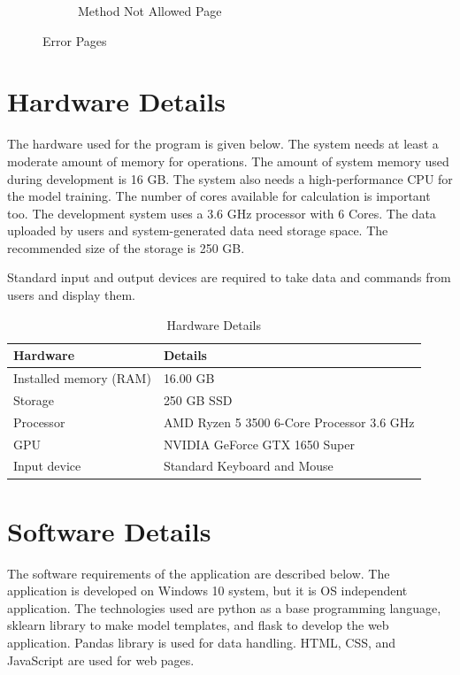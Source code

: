 \begin{figure}[H]
\begin{subfigure}{.7\columnwidth}
    \caption{Method Not Allowed Page}
    \label{fig:405_page}
  \end{subfigure}%
  \caption{Error Pages}\label{fig:error_pages}
\end{figure}

\FloatBarrier
\section{Hardware Details} \label{sec:hardware_details}
The hardware used for the program is given below. The system needs at least a moderate amount of memory for operations. The amount of system memory used during development is 16 GB. The system also needs a high-performance CPU for the model training. The number of cores available for calculation is important too. The development system uses a 3.6 GHz processor with 6 Cores. The data uploaded by users and system-generated data need storage space. The recommended size of the storage is 250 GB.

Standard input and output devices are required to take data and commands from users and display them.

\begin{table}[H]
  \centering
  \caption{Hardware Details} \label{tab:hardware_details}
  \begin{tabular}{|L{10em}|L{25em}|}
    \hline
    \textbf{Hardware}      & \textbf{Details}
    \rule[-2ex]{0pt}{4ex}                                              \\\hline
    Installed memory (RAM) & 16.00 GB
    \rule[-2ex]{0pt}{4ex}                                              \\\hline
    Storage                & 250 GB SSD
    \rule[-2ex]{0pt}{4ex}                                              \\\hline
    Processor              & AMD Ryzen 5 3500 6-Core Processor 3.6 GHz
    \rule[-2ex]{0pt}{4ex}                                              \\\hline
    GPU                    & NVIDIA GeForce GTX 1650 Super
    \rule[-2ex]{0pt}{4ex}                                              \\\hline
    Input device           & Standard Keyboard and Mouse
    \rule[-2ex]{0pt}{4ex}                                              \\\hline
  \end{tabular}
\end{table}

\section{Software Details} \label{sec:software_details}
The software requirements of the application are described below. The application is developed on Windows 10 system, but it is OS independent application. The technologies used are python as a base programming language, sklearn library to make model templates, and flask to develop the web application. Pandas library is used for data handling. HTML, CSS, and JavaScript are used for web pages.

